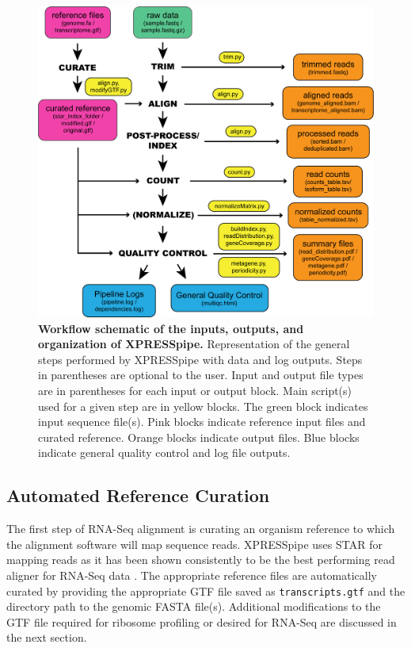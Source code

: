 \documentclass[10pt, oneside]{article}
\begin{document}
\begin{figure}
\centering
  \includegraphics[width=160mm]{figures/xpresspipe_figure1.png}
  \caption{\textbf{Workflow schematic of the inputs, outputs, and organization of XPRESSpipe.} Representation of the general steps performed by XPRESSpipe with data and log outputs. Steps in parentheses are optional to the user. Input and output file types are in parentheses for each input or output block. Main script(s) used for a given step are in yellow blocks. The green block indicates input sequence file(s). Pink blocks indicate reference input files and curated reference. Orange blocks indicate output files. Blue blocks indicate general quality control and log file outputs.}
  \label{fig:outputs}
\end{figure}

\subsection*{Automated Reference Curation}
The first step of RNA-Seq alignment is curating an organism reference to which the alignment software will map sequence reads. XPRESSpipe uses STAR \cite{star} for mapping reads as it has been shown consistently to be the best performing read aligner for RNA-Seq data \cite{alignment_benchmark, alignment_benchmark2}. The appropriate reference files are automatically curated by providing the appropriate GTF file saved as \texttt{transcripts.gtf} and the directory path to the genomic FASTA file(s). Additional modifications to the GTF file required for ribosome profiling or desired for RNA-Seq are discussed in the next section.\\
\end{document}

